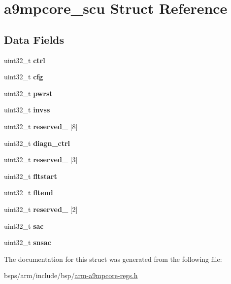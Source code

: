 \hypertarget{structa9mpcore__scu}{}\section{a9mpcore\+\_\+scu Struct Reference}
\label{structa9mpcore__scu}
\subsection*{Data Fields}
\begin{DoxyCompactItemize}
\item 
\mbox{\label{structa9mpcore__scu_a03130e77f5f7c6d26fa99f69f591012b}} 
uint32\+\_\+t {\bfseries ctrl}
\item 
\mbox{\label{structa9mpcore__scu_a50f79bf7e8a0872d1374232db5b245b0}} 
uint32\+\_\+t {\bfseries cfg}
\item 
\mbox{\label{structa9mpcore__scu_aa4a9b4c1bb9d6c43598cee82f6410bde}} 
uint32\+\_\+t {\bfseries pwrst}
\item 
\mbox{\label{structa9mpcore__scu_afacd8d5223cb7b7bdb56f2ace75d42a0}} 
uint32\+\_\+t {\bfseries invss}
\item 
\mbox{\label{structa9mpcore__scu_a8d8bc9b8330037e79b63340d715e0d0f}} 
uint32\+\_\+t {\bfseries reserved\+\_} \mbox{[}8\mbox{]}
\item 
\mbox{\label{structa9mpcore__scu_a179909d9935653245edea2ae63234c72}} 
uint32\+\_\+t {\bfseries diagn\+\_\+ctrl}
\item 
\mbox{\label{structa9mpcore__scu_a8af7cd51413b7fcaddfe26062ace535b}} 
uint32\+\_\+t {\bfseries reserved\+\_} \mbox{[}3\mbox{]}
\item 
\mbox{\label{structa9mpcore__scu_a914aa69a6a3822aef324aaea285bcd9c}} 
uint32\+\_\+t {\bfseries fltstart}
\item 
\mbox{\label{structa9mpcore__scu_a034106c971925b64702fc13a21214bd4}} 
uint32\+\_\+t {\bfseries fltend}
\item 
\mbox{\label{structa9mpcore__scu_a617b05320a29b90b6f6e5df71a8802ca}} 
uint32\+\_\+t {\bfseries reserved\+\_} \mbox{[}2\mbox{]}
\item 
\mbox{\label{structa9mpcore__scu_a449cf210726b9d1b424dd15d089b7e3c}} 
uint32\+\_\+t {\bfseries sac}
\item 
\mbox{\label{structa9mpcore__scu_a387169cbf6a2c92d343756cb27d247e5}} 
uint32\+\_\+t {\bfseries snsac}
\end{DoxyCompactItemize}


The documentation for this struct was generated from the following file\+:\begin{DoxyCompactItemize}
\item 
bsps/arm/include/bsp/\mbox{\hyperlink{arm-a9mpcore-regs_8h}{arm-\/a9mpcore-\/regs.\+h}}\end{DoxyCompactItemize}
